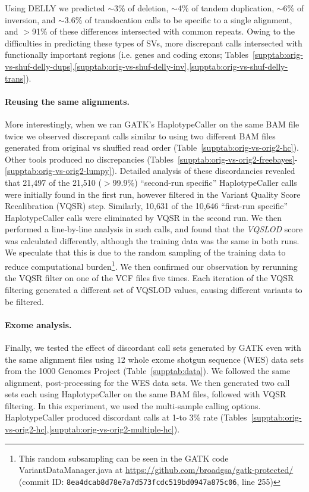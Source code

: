 \documentclass{bioinfo}
\begin{document}
Using DELLY we predicted $\sim$3\% of deletion, $\sim$4\% of tandem duplication, $\sim$6\% of inversion, and $\sim$3.6\% of translocation calls to be specific to a single alignment, and $>$91\% of these differences intersected with common repeats. Owing to the difficulties in predicting
these types of SVs, more discrepant calls intersected with functionally important regions (i.e. genes and coding exons;  Tables~\ref{supptab:orig-vs-shuf-delly-dups},\ref{supptab:orig-vs-shuf-delly-inv},\ref{supptab:orig-vs-shuf-delly-trans}).

\paragraph{Reusing the same alignments.}
More interestingly, when we ran GATK's HaplotypeCaller on the same BAM file twice we observed discrepant calls similar to using two different BAM files generated from original vs shuffled read order
(Table~\ref{supptab:orig-vs-orig2-hc}).
Other tools produced no discrepancies (Tables~\ref{supptab:orig-vs-orig2-freebayes}-\ref{supptab:orig-vs-orig2-lumpy}).
Detailed analysis of these discordancies revealed that  21,497 of the 21,510 ($>$99.9\%) ``second-run specific'' HaplotypeCaller calls were initially found in the first run, however filtered in the Variant Quality Score Recalibration (VQSR) step. Similarly, 10,631 of the 10,646 ``first-run specific'' HaplotypeCaller calls were eliminated by VQSR in the second run. We then performed a line-by-line analysis in such calls, and found that the {\it VQSLOD} score was calculated differently, although the training data was the same in both runs. 
We speculate that this is due to the random sampling of the training data
to reduce computational burden\footnote{This random subsampling can be seen in the GATK code VariantDataManager.java at %
\url{https://github.com/broadgsa/gatk-protected/} (commit ID: {\tt 8ea4dcab8d78e7a7d573fcdc519bd0947a875c06}, line 255)}. 
We then confirmed our observation by rerunning the VQSR filter on 
one of the VCF files five times. Each iteration of the VQSR filtering generated a different set of VQSLOD values, causing different variants to be filtered.


\paragraph{Exome analysis.}
Finally, we tested the effect of discordant call sets generated by GATK even with the same alignment files using 12 whole exome shotgun sequence (WES) data sets from the 1000 Genomes Project (Table~\ref{supptab:data}). We followed the same alignment, post-processing for the WES data sets.
We then generated two call sets each using HaplotypeCaller on the same BAM files, followed with VQSR filtering.
In this experiment, we used the multi-sample calling options. HaplotypeCaller produced discordant calls at 1-to 3\% rate
(Tables~\ref{supptab:orig-vs-orig2-hc},\ref{supptab:orig-vs-orig2-multiple-hc}). 
\end{document}
